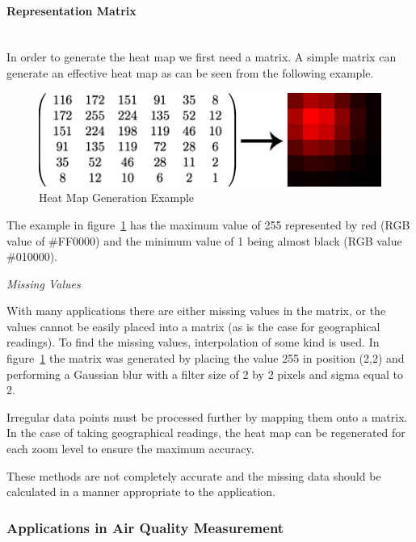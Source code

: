 \paragraph{Representation Matrix} \hspace{0pt} \\

In order to generate the heat map we first need a matrix. A simple matrix can generate an effective heat map as can be seen from the following example.

\begin{figure}[H]
        \begin{center}
                \includegraphics[scale=0.5]{./images/heatmaps/HeatMapGaussianExample.png}
                \caption{Heat Map Generation Example}
                \label{fig:matrixheatmapexample}
        \end{center}
\end{figure}

The example in figure~\ref{fig:matrixheatmapexample} has the maximum value of 255 represented by red (RGB value of \#FF0000) and the minimum value of 1 being almost black (RGB value \#010000). 

\emph{Missing Values}

With many applications there are either missing values in the matrix, or the values cannot be easily placed into a matrix (as is the case for geographical readings). To find the missing values, interpolation of some kind is used. In figure~\ref{fig:matrixheatmapexample} the matrix was generated by placing the value 255 in position (2,2) and performing a Gaussian blur with a filter size of 2 by 2 pixels and sigma equal to 2. 

Irregular data points must be processed further by mapping them onto a matrix. In the case of taking geographical readings, the heat map can be regenerated for each zoom level to ensure the maximum accuracy. 

These methods are not completely accurate and the missing data should be calculated in a manner appropriate to the application.

\subsubsection{Applications in Air Quality Measurement}\label{applicationsinaqmeasurement}

